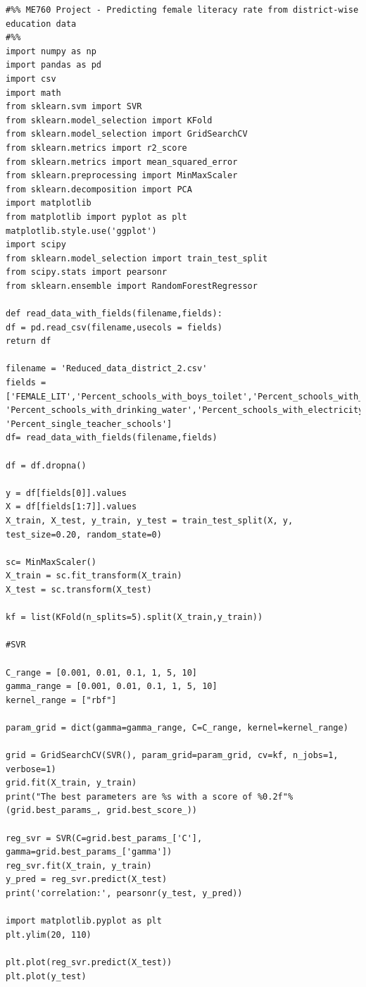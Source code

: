 \documentclass{article}
\begin{document}
\begin{appendices}
\begin{lstlisting}
#%% ME760 Project - Predicting female literacy rate from district-wise education data
#%%
import numpy as np
import pandas as pd
import csv
import math
from sklearn.svm import SVR
from sklearn.model_selection import KFold
from sklearn.model_selection import GridSearchCV
from sklearn.metrics import r2_score
from sklearn.metrics import mean_squared_error 
from sklearn.preprocessing import MinMaxScaler
from sklearn.decomposition import PCA
import matplotlib
from matplotlib import pyplot as plt
matplotlib.style.use('ggplot')
import scipy
from sklearn.model_selection import train_test_split
from scipy.stats import pearsonr
from sklearn.ensemble import RandomForestRegressor

def read_data_with_fields(filename,fields):
df = pd.read_csv(filename,usecols = fields)
return df

filename = 'Reduced_data_district_2.csv'
fields =['FEMALE_LIT','Percent_schools_with_boys_toilet','Percent_schools_with_playground',\
'Percent_schools_with_drinking_water','Percent_schools_with_electricity','Percent_schools_with_Roads', 'Percent_single_teacher_schools']
df= read_data_with_fields(filename,fields)

df = df.dropna()

y = df[fields[0]].values
X = df[fields[1:7]].values
X_train, X_test, y_train, y_test = train_test_split(X, y, test_size=0.20, random_state=0)

sc= MinMaxScaler()
X_train = sc.fit_transform(X_train)
X_test = sc.transform(X_test)

kf = list(KFold(n_splits=5).split(X_train,y_train))

#SVR

C_range = [0.001, 0.01, 0.1, 1, 5, 10]
gamma_range = [0.001, 0.01, 0.1, 1, 5, 10]
kernel_range = ["rbf"]

param_grid = dict(gamma=gamma_range, C=C_range, kernel=kernel_range)

grid = GridSearchCV(SVR(), param_grid=param_grid, cv=kf, n_jobs=1, verbose=1)
grid.fit(X_train, y_train)
print("The best parameters are %s with a score of %0.2f"% (grid.best_params_, grid.best_score_))

reg_svr = SVR(C=grid.best_params_['C'], gamma=grid.best_params_['gamma'])
reg_svr.fit(X_train, y_train)
y_pred = reg_svr.predict(X_test)
print('correlation:', pearsonr(y_test, y_pred))

import matplotlib.pyplot as plt
plt.ylim(20, 110)

plt.plot(reg_svr.predict(X_test))
plt.plot(y_test)


\end{lstlisting}
\end{appendices}
\end{document}
